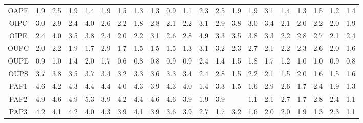 \documentclass[preprint,3p,9pt,times,onecolumn]{elsarticle}
\begin{document}
\begin{table}
{\begin{tabular}{| c || cccccccccccccccccccc |}
OAPE    & 1.9        & 2.5        & 1.9        & 1.4        & 1.9        & 1.5        & 1.3        & 1.3        & 0.9        & 1.1        & 2.3        & 2.5        & 1.9        & 1.9        & 3.1        & 1.4        & 1.3        & 1.5        & 1.2        & 1.4        \\
OIPC    & 3.0        & 2.9        & 2.4        & 4.0        & 2.6        & 2.2        & 1.8        & 2.8        & 2.1        & 2.2        & 3.1        & 2.9        & 3.8        & 3.0        & 3.4        & 2.1        & 2.0        & 2.2        & 2.0        & 1.9        \\
OIPE    & 2.4        & 4.0        & 3.5        & 3.8        & 2.4        & 2.0        & 2.2        & 3.1        & 2.6        & 2.8        & 4.9        & 3.3        & 3.5        & 3.8        & 3.3        & 2.2        & 2.8        & 2.7        & 2.1        & 2.4        \\
OUPC    & 2.0        & 2.2        & 1.9        & 1.7        & 2.9        & 1.7        & 1.5        & 1.5        & 1.5        & 1.3        & 3.1        & 3.2        & 2.3        & 2.7        & 2.1        & 2.2        & 2.3        & 2.6        & 2.0        & 1.6        \\
OUPE    & 0.9        & 1.0        & 1.4        & 2.0        & 1.7        & 0.6        & 0.8        & 0.8        & 0.9        & 0.9        & 2.4        & 1.4        & 1.5        & 1.8        & 1.7        & 1.2        & 1.0        & 1.0        & 0.9        & 0.8        \\
OUPS    & 3.7        & 3.8        & 3.5        & 3.7        & 3.4        & 3.2        & 3.3        & 3.6        & 3.3        & 3.4        & 2.4        & 2.8        & 1.5        & 2.2        & 2.1        & 1.5        & 2.0        & 1.6        & 1.5        & 1.6        \\
PAP1    & 4.6        & 4.2        & 4.3        & 4.4        & 4.4        & 4.0        & 4.3        & 3.9        & 4.3        & 4.0        & 1.4        & 3.3        & 1.5        & 1.6        & 2.9        & 2.6        & 1.7        & 2.4        & 1.9        & 1.3        \\
PAP2    & 4.9        & 4.6        & 4.9        & 5.3        & 3.9        & 4.2        & 4.4        & 4.6        & 4.6        & 3.9        & 1.9        & 3.9        &            & 1.1        & 2.1        & 2.7        & 1.7        & 2.8        & 2.4        & 1.1        \\
PAP3    & 4.2        & 4.1        & 4.2        & 4.0        & 4.3        & 3.9        & 4.1        & 3.9        & 3.6        & 3.9        & 2.7        & 1.7        & 3.2        & 1.6        & 2.0        & 2.0        & 1.9        & 1.3        & 2.3        & 1.1        \\

\end{tabular}}
\end{table}
\end{document}
